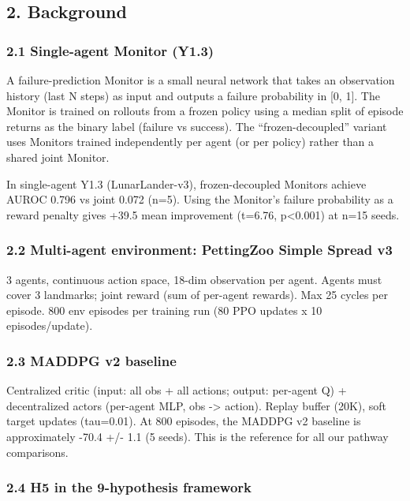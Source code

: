 \documentclass[
]{article}
\begin{document}
\subsection{2. Background}\label{background}

\subsubsection{2.1 Single-agent Monitor
(Y1.3)}\label{single-agent-monitor-y1.3}

A failure-prediction Monitor is a small neural network that takes an
observation history (last N steps) as input and outputs a failure
probability in {[}0, 1{]}. The Monitor is trained on rollouts from a
frozen policy using a median split of episode returns as the binary
label (failure vs success). The ``frozen-decoupled'' variant uses
Monitors trained independently per agent (or per policy) rather than a
shared joint Monitor.

In single-agent Y1.3 (LunarLander-v3), frozen-decoupled Monitors achieve
AUROC 0.796 vs joint 0.072 (n=5). Using the Monitor's failure
probability as a reward penalty gives +39.5 mean improvement (t=6.76,
p\textless0.001) at n=15 seeds.

\subsubsection{2.2 Multi-agent environment: PettingZoo Simple Spread
v3}\label{multi-agent-environment-pettingzoo-simple-spread-v3}

3 agents, continuous action space, 18-dim observation per agent. Agents
must cover 3 landmarks; joint reward (sum of per-agent rewards). Max 25
cycles per episode. 800 env episodes per training run (80 PPO updates x
10 episodes/update).

\subsubsection{2.3 MADDPG v2 baseline}\label{maddpg-v2-baseline}

Centralized critic (input: all obs + all actions; output: per-agent Q) +
decentralized actors (per-agent MLP, obs -\textgreater{} action). Replay
buffer (20K), soft target updates (tau=0.01). At 800 episodes, the
MADDPG v2 baseline is approximately -70.4 +/- 1.1 (5 seeds). This is the
reference for all our pathway comparisons.

\subsubsection{2.4 H5 in the 9-hypothesis
framework}\label{h5-in-the-9-hypothesis-framework}
\end{document}
